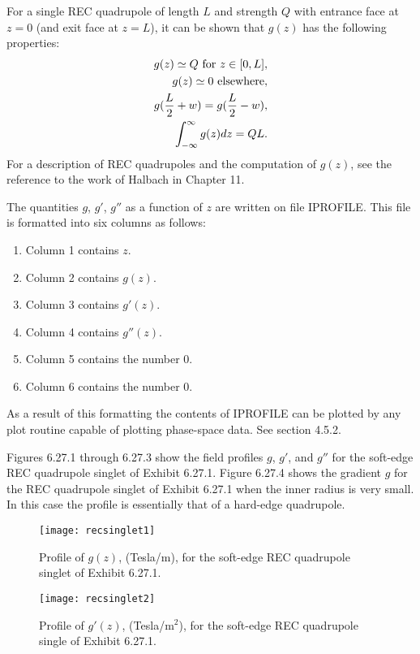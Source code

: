 For a single REC quadrupole of length $L$ and strength $Q$ with entrance
face at $z=0$ (and exit face at $z=L$), it can be shown that $g(z)$ has the following properties:
\begin{eqnarray*}
g(z)  \simeq  Q \ {\rm for}  \ z\in [0,L],\\
g(z)  \simeq  0 \ {\rm elsewhere},\\
g(\frac{L}{2}+w)  =  g(\frac{L}{2}-w),\\
\int_{-\infty}^{\infty} g(z)dz  =  QL.
\end{eqnarray*}
For a description of REC quadrupoles and the computation of $g(z)$, see
the reference to the work of Halbach in Chapter 11.

The quantities $g$, $g'$, $g''$ as a function of $z$ are written on file IPROFILE.  This file is formatted into six columns as follows:
\begin{enumerate}
   \item  Column 1 contains $z.$
   \item  Column 2 contains $g(z).$
   \item  Column 3 contains $g'(z).$
   \item  Column 4 contains $g''(z).$
   \item  Column 5 contains the number 0.
   \item  Column 6 contains the number 0.
\end{enumerate}
As a result of this formatting the contents of IPROFILE can be plotted by any plot routine capable of plotting \Mary phase-space data.  See section 4.5.2.

Figures 6.27.1 through 6.27.3 show the field profiles $g$, $g'$, and
$g''$ for the soft-edge REC quadrupole singlet of Exhibit 6.27.1.  Figure
6.27.4 shows the gradient $g$ for the REC quadrupole singlet of Exhibit 6.27.1 when the inner radius is very small.  In this case the profile is essentially that of a hard-edge quadrupole.  

\newpage
\begin{figure}[h]
  \centering
  \texttt{[image: recsinglet1]}
  \caption{Profile of $g(z)$, (Tesla/m), for the soft-edge REC quadrupole singlet of Exhibit 6.27.1.}
\end{figure}

\begin{figure}[h]
  \centering
  \texttt{[image: recsinglet2]}
  \caption{Profile of $g'(z)$, (Tesla/$\mbox{m}^2$), for the soft-edge REC quadrupole single of Exhibit 6.27.1.}
\end{figure}

